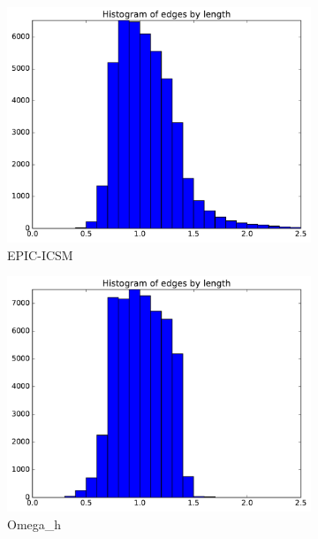 \documentclass[3p,times,procedia,number]{elsarticle}
\begin{document}
\begin{figure}
\begin{subfigure}{.24\textwidth}
\includegraphics[width=\textwidth]{epic-icsm-cube-cylinder-linear-length.pdf}
\caption{EPIC-ICSM}
\end{subfigure}
\begin{subfigure}{.24\textwidth}
\centering
\includegraphics[width=\textwidth]{omega_h-cube-cylinder-linear-length.pdf}
\caption{Omega\_h}
\end{subfigure}
\begin{subfigure}{.24\textwidth}
\centering

\end{subfigure}
\end{figure}
\end{document}
